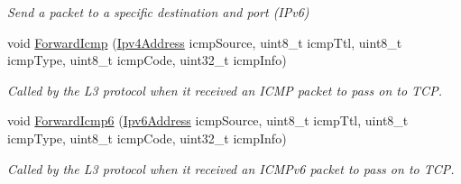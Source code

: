 \begin{DoxyCompactItemize}
\begin{DoxyCompactList}\small\item\em Send a packet to a specific destination and port (I\+Pv6) \end{DoxyCompactList}\item 
void \hyperlink{classns3_1_1UdpSocketImpl_a2f67e00e32fdb33ad58e1f429377a130}{Forward\+Icmp} (\hyperlink{classns3_1_1Ipv4Address}{Ipv4\+Address} icmp\+Source, uint8\+\_\+t icmp\+Ttl, uint8\+\_\+t icmp\+Type, uint8\+\_\+t icmp\+Code, uint32\+\_\+t icmp\+Info)
\begin{DoxyCompactList}\small\item\em Called by the L3 protocol when it received an I\+C\+MP packet to pass on to T\+CP. \end{DoxyCompactList}\item 
void \hyperlink{classns3_1_1UdpSocketImpl_af83861011e4674d8f4c31b13f78c2204}{Forward\+Icmp6} (\hyperlink{classns3_1_1Ipv6Address}{Ipv6\+Address} icmp\+Source, uint8\+\_\+t icmp\+Ttl, uint8\+\_\+t icmp\+Type, uint8\+\_\+t icmp\+Code, uint32\+\_\+t icmp\+Info)
\begin{DoxyCompactList}\small\item\em Called by the L3 protocol when it received an I\+C\+M\+Pv6 packet to pass on to T\+CP. \end{DoxyCompactList}\end{DoxyCompactItemize}

